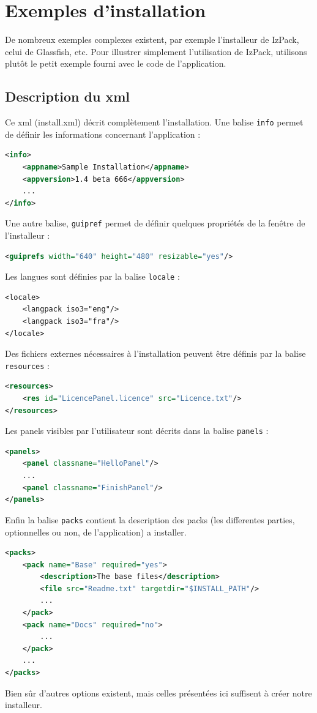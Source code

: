 
\section{Exemples d'installation}
De nombreux exemples complexes existent, par exemple l'installeur de IzPack, celui de Glassfish, etc. Pour illustrer simplement l'utilisation de IzPack, utilisons plutôt le petit exemple fourni avec le code de l'application.

\subsection{Description du xml}


Ce xml (install.xml) décrit complètement l'installation.
Une balise \verb|info| permet de définir les informations concernant l'application : 
\begin{lstlisting}[language=xml]
<info>
	<appname>Sample Installation</appname>
	<appversion>1.4 beta 666</appversion>
	...
</info>
\end{lstlisting}
Une autre balise, \verb|guipref| permet de définir quelques propriétés de la fenêtre de l'installeur :
\begin{lstlisting}[language=xml]
<guiprefs width="640" height="480" resizable="yes"/>
\end{lstlisting}
Les langues sont définies par la balise \verb|locale| :
\begin{lstlisting}
<locale>
	<langpack iso3="eng"/>
	<langpack iso3="fra"/>
</locale>
\end{lstlisting}
Des fichiers externes nécessaires à l'installation peuvent être définis par la balise \verb|resources| :

\begin{lstlisting}[language=xml]
<resources>
	<res id="LicencePanel.licence" src="Licence.txt"/>
</resources>
\end{lstlisting}
Les panels visibles par l'utilisateur sont décrits dans la balise \verb|panels| :
\begin{lstlisting}[language=xml]
<panels>
	<panel classname="HelloPanel"/>
	...
	<panel classname="FinishPanel"/>
</panels>
\end{lstlisting}
Enfin la balise \verb|packs| contient la description des packs (les differentes parties, optionnelles ou non, de l'application) a installer.
\begin{lstlisting}[language=xml]
<packs>
	<pack name="Base" required="yes">
		<description>The base files</description>
		<file src="Readme.txt" targetdir="$INSTALL_PATH"/>
		...
	</pack>
	<pack name="Docs" required="no">
		...
	</pack>
	...
</packs>
\end{lstlisting}
Bien sûr d'autres options existent, mais celles présentées ici suffisent à créer notre installeur.
